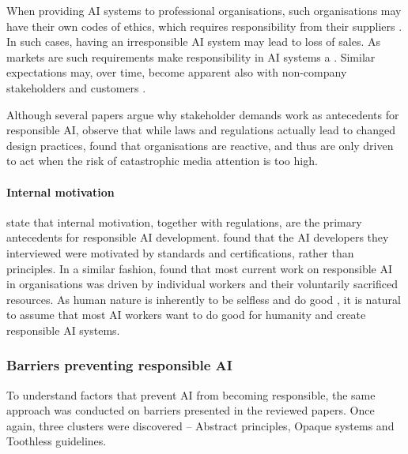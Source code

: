 When providing AI systems to professional organisations, such organisations may have their own codes of ethics, which requires responsibility from their suppliers \parencite{Anagnostou_2022}. In such cases, having an irresponsible AI system may lead to loss of sales. As markets are  such requirements make responsibility in AI systems a  \parencite[p.~2]{Gupta_2021}. Similar expectations may, over time, become apparent also with non-company stakeholders and customers \parencite{WangY_2020}.

Although several papers argue why stakeholder demands work as antecedents for responsible AI, \textcite[p.~8]{Morley_2021} observe that while laws and regulations actually lead to changed design practices,  \textcite{Rakova_2021} found that organisations are reactive, and thus are only driven to act when the risk of catastrophic media attention is too high.


\paragraph{Internal motivation}
\textcite{Kumar_2021} state that internal motivation, together with regulations, are the primary antecedents for responsible AI development. \textcite{Henriksen_2021} found that the AI developers they interviewed were motivated by standards and certifications, rather than principles. In a similar fashion, \textcite{Rakova_2021} found that most current work on responsible AI in organisations was driven by individual workers and their voluntarily sacrificed resources. As human nature is inherently to be selfless and do good \parencite{Ward_2012_results}, it is natural to assume that most AI workers want to do good for humanity and create responsible AI systems.


\subsubsection{Barriers preventing responsible AI}
To understand factors that prevent AI from becoming responsible, the same approach was conducted on barriers presented in the reviewed papers. Once again, three clusters were discovered -- Abstract principles, Opaque systems and Toothless guidelines.

